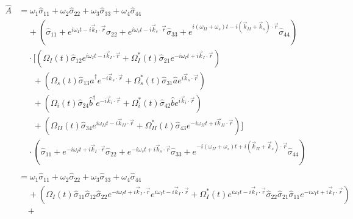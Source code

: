 \documentclass[aps,pra,showpacs,amsmath,amssymb,nofootinbib,longbibliography,superscriptaddress
]{revtex4-1}
\theoremstyle{definition}
\theoremstyle{remark}
\newcommand{\0}{\hat{0}}
\begin{document}
\begin{align}
    \hat{A}
    &=
    \omega_1 \hat{\sigma}_{11} + \omega_2 \hat{\sigma}_{22} + \omega_3 \hat{\sigma}_{33} + \omega_4 \hat{\sigma}_{44} \nonumber \\
    &\;\;\;\;+ \left(\hat{\sigma}_{11} + e^{i \omega_I t - i \vec{k}_I \cdot \vec{r}} \hat{\sigma}_{22} + e^{i \omega_s t - i \vec{k}_s \cdot \vec{r}} \hat{\sigma}_{33} + e^{i(\omega_{II} + \omega_s) t - i(\vec{k}_{II} + \vec{k}_s) \cdot \vec{r}} \hat{\sigma}_{44}\right) \nonumber\\
    &\;\;\;\;\cdot \biggl[
        \left(\Omega_{I}(t) \hat{\sigma}_{12} e^{i \omega_I t - i \vec{k}_I \cdot \vec{r}} + \Omega_{I}^*(t) \hat{\sigma}_{21} e^{-i \omega_I t + i \vec{k}_I \cdot \vec{r}}\right)\nonumber \\
        &\;\;\;\;\;\;+ \left(\Omega_{s}(t) \hat{\sigma}_{13} \hat{a}^{\dagger} e^{-i \vec{k}_{s} \cdot \vec{r}} + \Omega_{s}^*(t) \hat{\sigma}_{31} \hat{a} e^{i \vec{k}_{s} \cdot \vec{r}}\right)\nonumber \\
        &\;\;\;\;\;\;+ \left(\Omega_{i}(t) \hat{\sigma}_{24} \hat{b}^{\dagger} e^{-i \vec{k}_{i} \cdot \vec{r}} + \Omega_{i}^*(t) \hat{\sigma}_{42} \hat{b} e^{i \vec{k}_{i} \cdot \vec{r}}\right)\nonumber \\
        &\;\;\;\;\;\;+ \left(\Omega_{II}(t) \hat{\sigma}_{34} e^{i \omega_{II} t - i \vec{k}_{II} \cdot \vec{r}} + \Omega_{II}^*(t) \hat{\sigma}_{43} e^{-i \omega_{II} t + i \vec{k}_{II} \cdot \vec{r}}\right)
    \biggr] \nonumber \\
    &\;\;\;\; \cdot \left(\hat{\sigma}_{11} + e^{-i \omega_I t + i \vec{k}_I \cdot \vec{r}} \hat{\sigma}_{22} + e^{-i \omega_s t + i \vec{k}_s \cdot \vec{r}} \hat{\sigma}_{33} + e^{-i(\omega_{II} + \omega_s) t + i(\vec{k}_{II} + \vec{k}_s) \cdot \vec{r}} \hat{\sigma}_{44}\right)\nonumber \\ \nonumber\\
    &=
    \omega_1 \hat{\sigma}_{11} + \omega_2 \hat{\sigma}_{22} + \omega_3 \hat{\sigma}_{33} + \omega_4 \hat{\sigma}_{44} \nonumber \\
    &\;\;\;\;+
    \left(
        \Omega_{I}(t) \hat{\sigma}_{11} \hat{\sigma}_{12} \hat{\sigma}_{22} e^{-i \omega_I t + i \vec{k}_I \cdot \vec{r}} e^{i \omega_I t - i \vec{k}_I \cdot \vec{r}} +
        \Omega_{I}^*(t) e^{i \omega_I t - i \vec{k}_I \cdot \vec{r}} \hat{\sigma}_{22} \hat{\sigma}_{21} \hat{\sigma}_{11} e^{-i \omega_I t + i \vec{k}_I \cdot \vec{r}}
    \right)\nonumber \\
    &\;\;\;\;+

\end{align}
\end{document}
